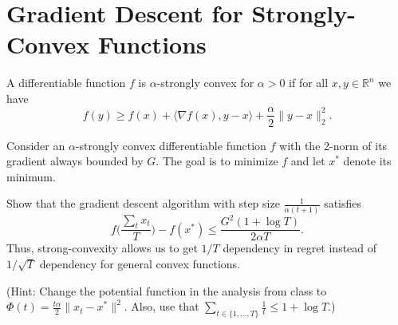 \documentclass[10pt,letterpaper]{article}
\begin{document}
\section{Gradient Descent for Strongly-Convex Functions} \label{sec:StrongConvex}
 A differentiable function $f$ is $\alpha$-strongly convex for $\alpha >0$ if for all $x,y \in \mathbb{R}^n$ we have 
 \[ f(y) \geq f(x) + \langle \nabla f(x), y-x \rangle + \frac{\alpha}{2}\|y-x\|_2^2 .\]
 
 Consider an $\alpha$-strongly convex differentiable function $f$  with the 2-norm of its gradient always bounded by $G$. The goal is to minimize $f$ and let $x^*$ denote its minimum. 
 
 Show that the  gradient descent algorithm with  step size $\frac{1}{\alpha (t+1)}$ satisfies 
 \[ f\Big( \frac{\sum_t x_t}{T} \Big) - f(x^*) \leq \frac{G^2 (1+\log T)}{2 \alpha T}.\] 
 Thus, strong-convexity allows us to get $1/T$ dependency in regret instead of $1/\sqrt{T}$ dependency for general convex functions.

(Hint: Change the potential function in the analysis from class to  $\Phi(t) = \frac{t \alpha}{2} \|x_t - x^* \|^2$. Also, use that $\sum_{t\in \{1,\ldots, T\}}\frac{1}{t} \leq 1+\log T$.)

 
\end{document}
